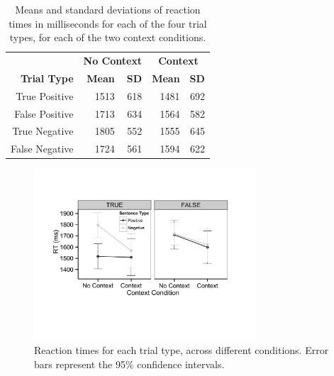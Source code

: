 \documentclass[10pt,letterpaper]{article}
\begin{document}
\begin{table}[t]
\caption{Means and standard deviations of reaction times in milliseconds for each of the four trial types, for each of the two context conditions.}
\begin{center}
\small\addtolength{\tabcolsep}{-5pt}
\begin{tabular}{ r  r  r  r  r } 
\hline
& \multicolumn{2}{c}{\bf{No Context}} & \multicolumn{2}{c}{\bf{Context}} \\
  \bf{Trial Type} & \bf{Mean} & \bf{SD} & \bf{Mean} & \bf{SD} \\ \hline                    
True Positive & 1513 & 618 &  1481 & 692\\
 False Positive & 1713 & 634 &  1564 & 582\\
 True Negative& 1805 & 552 & 1555 & 645\\
  False Negative & 1724 & 561 & 1594 & 622 \\
\hline
\end{tabular}
\end{center}
\end{table}

\begin{figure}
\begin{center} 
\includegraphics[width=3.25in]{figures/study1_linegraph.pdf}
\caption{\label{fig:addition_subs} Reaction times for each trial type, across different conditions.  Error bars represent the 95\% confidence intervals.}
\end{center} 
\end{figure}
\end{document}
